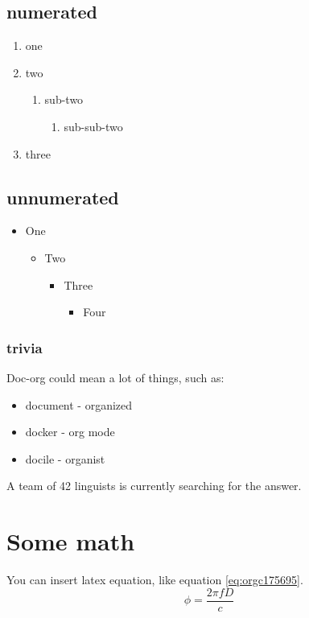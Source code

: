 \subsection{numerated}
\label{sec:org6a3b0cd}
\begin{enumerate}
\item one
\item two
\begin{enumerate}
\item sub-two
\begin{enumerate}
\item sub-sub-two
\end{enumerate}
\end{enumerate}
\item three
\end{enumerate}

\subsection{unnumerated}
\label{sec:orgb02438b}
\begin{itemize}
\item One
\begin{itemize}
\item Two
\begin{itemize}
\item Three
\begin{itemize}
\item Four
\end{itemize}
\end{itemize}
\end{itemize}
\end{itemize}

\subsubsection{trivia}
\label{sec:org5caea08}
Doc-org could mean a lot of things, such as:
\begin{itemize}
\item document - organized
\item docker - org mode
\item docile - organist
\end{itemize}
A team of 42 linguists is currently searching for the answer.

\section{Some math}
\label{sec:org1b7c054}
You can insert latex equation, like equation \ref{eq:orgc175695}.
\begin{equation}
\label{eq:orgc175695}
\phi = \frac{2\pi fD}{c}
\end{equation}


